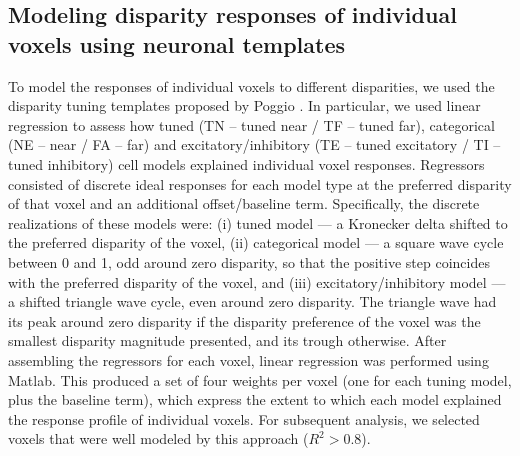 \subsection{Modeling disparity responses of individual voxels using neuronal templates}
To model the responses of individual voxels to different disparities, we used the disparity tuning templates proposed by Poggio \cite{Poggio:1988ij,Poggio:1977ys}. In particular, we used linear regression to assess how tuned (TN -- tuned near / TF -- tuned far), categorical (NE -- near / FA -- far) and excitatory/inhibitory (TE -- tuned excitatory / TI -- tuned inhibitory) cell models explained individual voxel responses. Regressors consisted of discrete ideal responses for each model type at the preferred disparity of that voxel and an additional offset/baseline term. Specifically, the discrete realizations of these models were: (i) tuned model --- a Kronecker delta shifted to the preferred disparity of the voxel, (ii) categorical model --- a square wave cycle between 0 and 1, odd around zero disparity, so that the positive step coincides with the preferred disparity of the voxel, and (iii) excitatory/inhibitory model --- a shifted triangle wave cycle, even around zero disparity. The triangle wave had its peak around zero disparity if the disparity preference of the voxel was the smallest disparity magnitude presented, and its trough otherwise. After assembling the regressors for each voxel, linear regression was performed using Matlab. This produced a set of four weights per voxel (one for each tuning model, plus the baseline term), which express the extent to which each model explained the response profile of individual voxels. For subsequent analysis, we selected voxels that were well modeled by this approach ($R^2 > 0.8$). 

